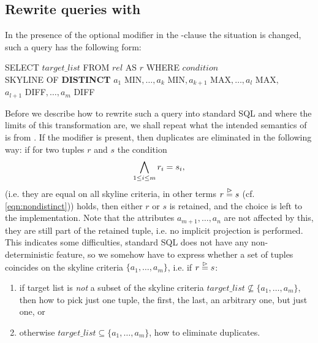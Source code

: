 \subsection{Rewrite queries with }
\label{sec:rewrite-queries-with-distinct}
In the presence of the optional  modifier in the
-clause the situation is changed, such a query has the
following form:
%
\begin{sql}\label{sql:rewrite-distinct}
SELECT $target\_list$ FROM $rel$ AS $r$ WHERE $condition$ \\
SKYLINE OF \textbf{DISTINCT} $a_1$ MIN$, \ldots, a_k$ MIN$, a_{k+1}$ MAX$, \ldots, a_l$ MAX$,$  \\
$a_{l+1}$ DIFF$, \ldots, a_m$ DIFF
\end{sql}
%
Before we describe how to rewrite such a query into standard SQL and
where the limits of this transformation are, we shall repeat what the
intended semantics of  is from
\citep{Borzsonyi2001}.  If the  modifier is
present, then duplicates are eliminated in the following way: if for
two tuples $r$ and $s$ the condition
\[
\bigwedge_{1 \le i \le m} r_i = s_i,
\]
(i.e. they are equal on all skyline criteria, in other terms $r
\stackrel{\vartriangleright}{=} s$ (cf. \eqref{eqn:nondistinct})) holds, then either $r$
or $s$ is retained, and the choice is left to the implementation. Note
that the attributes $a_{m+1}, \ldots, a_n$ are not affected by this,
they are still part of the retained tuple, i.e. no implicit projection
is performed. This indicates some difficulties, standard SQL does not
have any non-deterministic feature, so we somehow have to express whether
a set of tuples coincides on the skyline criteria $\{a_1, \ldots,
a_m\}$, i.e. if $r \stackrel{\vartriangleright}{=} s$:

\begin{enumerate}
\item
if target list is \emph{not} a subset of the skyline criteria $target\_list
\not\subseteq \{a_1, \ldots, a_m\}$, then how to pick just one tuple,
the first, the last, an arbitrary one, but just one, or

\item
otherwise $target\_list \subseteq \{a_1, \ldots, a_m\}$, how to
eliminate duplicates.
\end{enumerate}


